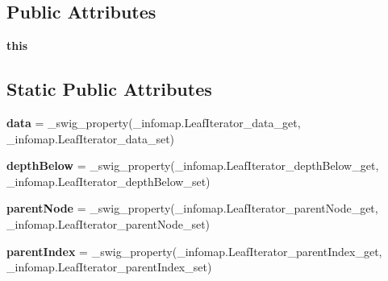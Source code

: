 \subsection*{Public Attributes}
\begin{DoxyCompactItemize}
\item 
\mbox{\label{classdsmacc_1_1graph_1_1infomap_1_1LeafIterator_af548036e11e04e9f19c22dde6fe8a6ec}} 
{\bfseries this}
\end{DoxyCompactItemize}
\subsection*{Static Public Attributes}
\begin{DoxyCompactItemize}
\item 
\mbox{\label{classdsmacc_1_1graph_1_1infomap_1_1LeafIterator_a8b9f4bb359e77a81a41c83a8da73c351}} 
{\bfseries data} = \+\_\+swig\+\_\+property(\+\_\+infomap.\+Leaf\+Iterator\+\_\+data\+\_\+get, \+\_\+infomap.\+Leaf\+Iterator\+\_\+data\+\_\+set)
\item 
\mbox{\label{classdsmacc_1_1graph_1_1infomap_1_1LeafIterator_a80d2b6891511314ec2f3685490c866b6}} 
{\bfseries depth\+Below} = \+\_\+swig\+\_\+property(\+\_\+infomap.\+Leaf\+Iterator\+\_\+depth\+Below\+\_\+get, \+\_\+infomap.\+Leaf\+Iterator\+\_\+depth\+Below\+\_\+set)
\item 
\mbox{\label{classdsmacc_1_1graph_1_1infomap_1_1LeafIterator_a078451173078552a7d78baeb3562593c}} 
{\bfseries parent\+Node} = \+\_\+swig\+\_\+property(\+\_\+infomap.\+Leaf\+Iterator\+\_\+parent\+Node\+\_\+get, \+\_\+infomap.\+Leaf\+Iterator\+\_\+parent\+Node\+\_\+set)
\item 
\mbox{\label{classdsmacc_1_1graph_1_1infomap_1_1LeafIterator_abefb00b46eadd2f37306747cafe9d912}} 
{\bfseries parent\+Index} = \+\_\+swig\+\_\+property(\+\_\+infomap.\+Leaf\+Iterator\+\_\+parent\+Index\+\_\+get, \+\_\+infomap.\+Leaf\+Iterator\+\_\+parent\+Index\+\_\+set)
\item 
\mbox{\label{classdsmacc_1_1graph_1_1infomap_1_1LeafIterator_a66f55a18b572d8b2b5d8131ef924306f}} 

\end{DoxyCompactItemize}
